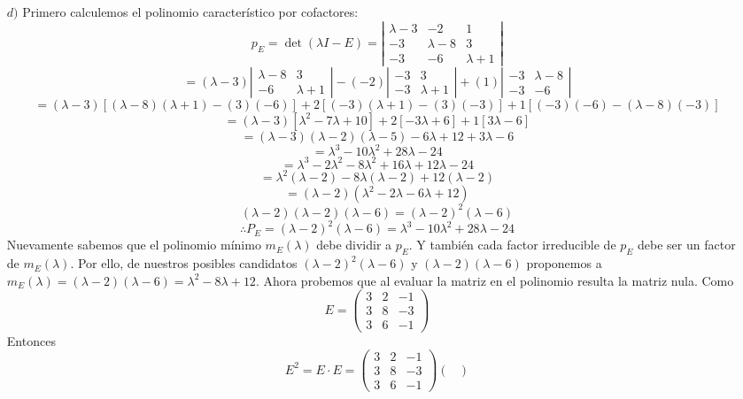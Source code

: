 \begin{enumerate}
\item[$d)$] Primero calculemos el polinomio característico por cofactores:
\[ p_E=\det( \lambda I-E)= \left| \begin{array}{ccc}	
\lambda-3 & -2 & 1\\
-3 & \lambda -8 & 3\\
-3 &-6 & \lambda +1 \end{array} \right| \]
\[ = (\lambda -3)\left| \begin{array}{cc}	
\lambda-8 & 3\\
-6 & \lambda +1 \end{array} \right| - (-2)\left| \begin{array}{cc}	
-3 & 3\\
-3 & \lambda +1 \end{array} \right| + (1)\left| \begin{array}{cc}	
-3 & \lambda -8\\
-3 & -6 \end{array} \right|\]
\[=(\lambda -3)[(\lambda -8)(\lambda +1)-(3)(-6)]+2[(-3)(\lambda +1)-(3)(-3)]+1[(-3)(-6)-(\lambda -8)(-3)]\] \[= (\lambda -3)[\lambda ^2-7\lambda +10]+2[-3\lambda +6]+1[3\lambda -6]\] \[=(\lambda -3)(\lambda -2)(\lambda -5)-6\lambda +12+3\lambda -6\]\[=\lambda ^3 -10\lambda ^2 +28\lambda -24\]\[=\lambda ^3-2\lambda ^2 -8\lambda ^2+16\lambda + 12\lambda -24\]\[=\lambda ^2(\lambda -2)-8\lambda (\lambda -2)+12(\lambda -2)\] \[=(\lambda -2)(\lambda ^2-2\lambda -6\lambda +12)\] \[(\lambda -2)(\lambda -2)(\lambda -6)=(\lambda -2)^2(\lambda -6)\]\[\therefore P_E=(\lambda -2)^2(\lambda -6)=\lambda ^3 -10\lambda ^2 +28\lambda -24\]
Nuevamente sabemos que el polinomio mínimo $m_E(\lambda)$ debe dividir a $p_E$. Y también cada factor irreducible de $p_E$ debe ser un factor de $m_E(\lambda)$. Por ello, de nuestros posibles candidatos $(\lambda -2)^2(\lambda -6)$ y $(\lambda -2)(\lambda -6)$ proponemos a $m_E(\lambda)=(\lambda -2)(\lambda -6)=\lambda ^2-8\lambda+12$. Ahora probemos que al evaluar la matriz en el polinomio resulta la matriz nula.
Como
\[E = \begin{pmatrix}
	3 & 2 & -1 \\
	3 & 8 & -3 \\
	3 & 6 & -1\end{pmatrix}\]
Entonces
\[E^2=E\cdot E= \begin{pmatrix}
	3 & 2 & -1 \\
	3 & 8 & -3 \\
	3 & 6 & -1\end{pmatrix}\begin{pmatrix}

\end{pmatrix}\]
\end{enumerate}
